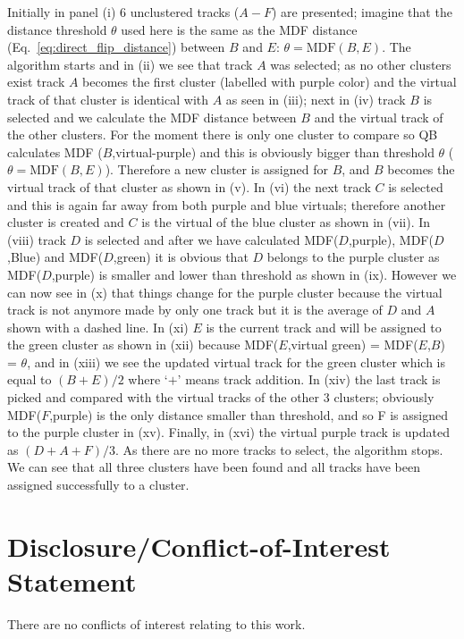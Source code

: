 \documentclass{bioinfo}
\begin{document}
\noindent
Initially in panel (i) 6 unclustered tracks ($A-F$) are presented; imagine
that the distance threshold $\theta$ used here is the same as the MDF
distance (Eq.~\ref{eq:direct_flip_distance}) between $B$ and $E$: $\theta =
\mathrm{MDF}(B,E)$. The algorithm starts and in (ii) we see that track $A$ was
selected; as no other clusters exist track $A$ becomes the first cluster
(labelled with purple color) and the virtual track of that cluster is
identical with $A$ as seen in (iii); next in (iv) track $B$ is selected and
we calculate the MDF distance between $B$ and the virtual track of the
other clusters. For the moment there is only one cluster to compare so
QB calculates MDF ($B$,virtual-purple) and this is obviously bigger than
threshold $\theta$ ($\theta = \mathrm{MDF}(B,E)$).  Therefore a new cluster is
assigned for $B$, and $B$ becomes the virtual track of that cluster as shown
in (v). In (vi) the next track $C$ is selected and this is again far away
from both purple and blue virtuals; therefore another cluster is created
and $C$ is the virtual of the blue cluster as shown in (vii).  In (viii)
track $D$ is selected and after we have calculated MDF($D$,purple),
MDF($D$,Blue) and MDF($D$,green) it is obvious that $D$ belongs to the purple
cluster as MDF($D$,purple) is smaller and lower than threshold as shown in
(ix).  However we can now see in (x) that things change for the purple
cluster because the virtual track is not anymore made by only one track
but it is the average of $D$ and $A$ shown with a dashed line. In (xi) $E$ is
the current track and will be assigned to the green cluster as shown in
(xii) because MDF($E$,virtual green) = MDF($E$,$B$) = $\theta$, and in (xiii)
we see the updated virtual track for the green cluster which is equal to
$(B+E)/2$ where `$+$' means track addition. In (xiv) the last track is picked
and compared with the virtual tracks of the other 3 clusters; obviously
MDF($F$,purple) is the only distance smaller than threshold, and so F is
assigned to the purple cluster in (xv).  Finally, in (xvi) the virtual
purple track is updated as $(D+A+F)/3$. As there are no more tracks to
select, the algorithm stops. We can see that all three clusters have
been found and all tracks have been assigned successfully to a cluster.


\section*{Disclosure/Conflict-of-Interest Statement}
There are no conflicts of interest relating to this work.

%
%
%

%

\end{document}
